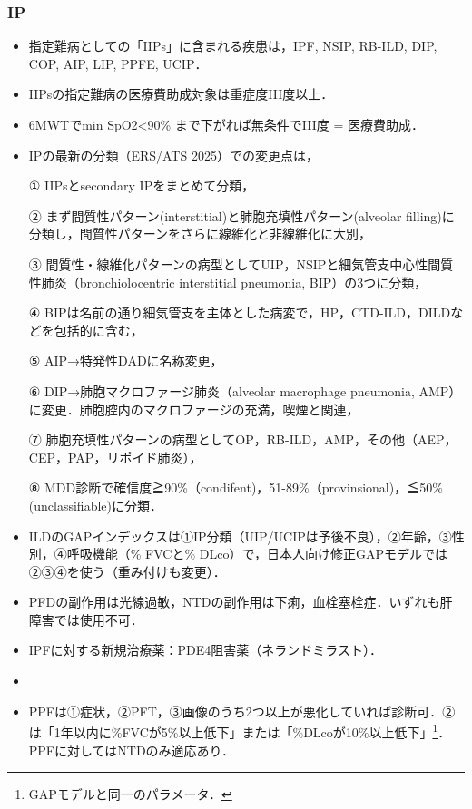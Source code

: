 \subsubsection{IP}

\begin{itemize}
\item 指定難病としての「IIPs」に含まれる疾患は，IPF, NSIP, RB-ILD, DIP, COP, AIP, LIP, PPFE, UCIP．
\item IIPsの指定難病の医療費助成対象は重症度III度以上．
\item 6MWTでmin SpO2<90\% まで下がれば無条件でIII度 = 医療費助成．
\item IPの最新の分類（ERS/ATS 2025）での変更点は，

① IIPsとsecondary IPをまとめて分類，

② まず間質性パターン(interstitial)と肺胞充填性パターン(alveolar filling)に分類し，間質性パターンをさらに線維化と非線維化に大別，

③ 間質性・線維化パターンの病型としてUIP，NSIPと細気管支中心性間質性肺炎（bronchiolocentric interstitial pneumonia, BIP）の3つに分類，

④ BIPは名前の通り細気管支を主体とした病変で，HP，CTD-ILD，DILDなどを包括的に含む，

⑤ AIP→特発性DADに名称変更，

⑥ DIP→肺胞マクロファージ肺炎（alveolar macrophage pneumonia, AMP）に変更．肺胞腔内のマクロファージの充満，喫煙と関連，

⑦ 肺胞充填性パターンの病型としてOP，RB-ILD，AMP，その他（AEP，CEP，PAP，リポイド肺炎），

⑧ MDD診断で確信度≧90\%（condifent)，51-89\%（provinsional)，≦50\% (unclassifiable)に分類．

\item ILDのGAPインデックスは①IP分類（UIP/UCIPは予後不良），②年齢，③性別，④呼吸機能（\% FVCと\% DLco）で，日本人向け修正GAPモデルでは②③④を使う（重み付けも変更）．

\item PFDの副作用は光線過敏，NTDの副作用は下痢，血栓塞栓症．いずれも肝障害では使用不可．
\item IPFに対する新規治療薬：PDE4阻害薬（ネランドミラスト）．
\item 
\item PPFは①症状，②PFT，③画像のうち2つ以上が悪化していれば診断可．②は「1年以内に\%FVCが5\%以上低下」または「\%DLcoが10\%以上低下」\footnote{GAPモデルと同一のパラメータ．}．PPFに対してはNTDのみ適応あり．


\end{itemize}
